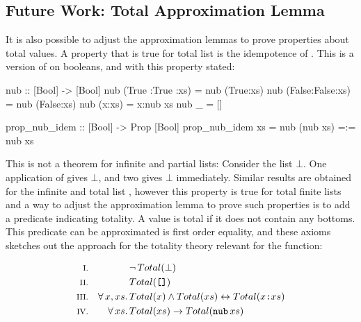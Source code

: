 
\subsection{Future Work: Total Approximation Lemma}
\label{sec:totalapprox}

It is also possible to adjust the approximation lemmas to prove
properties about total values. A property that is true for total list
is the idempotence of . This is a version of  on
booleans, and with this property stated:

\begin{code}
nub :: [Bool] -> [Bool]
nub (True :True :xs) = nub (True:xs)
nub (False:False:xs) = nub (False:xs)
nub (x:xs)           = x:nub xs
nub _                = []

prop_nub_idem :: [Bool] -> Prop [Bool]
prop_nub_idem xs = nub (nub xs) =:= nub xs
\end{code}

\noindent
This is not a theorem for infinite and partial lists: Consider the
list $\bot$. One application of  gives
$\bot$, and two gives $\bot$ immediately. Similar results
are obtained for the infinite and total list , however
this property is true for total finite lists and a way to adjust the
approximation lemma to prove such properties is to add a predicate
indicating totality. A value is total if it does not contain any
bottoms. This predicate can be approximated is first order equality,
and these axioms sketches out the approach for the totality theory
relevant for the  function:

\begin{align*}
\rom{1} &&             & \neg \, Total(\bot) \\
\rom{2} &&             & Total(\hs{[]}) \\
\rom{3} && \faa{x}{xs} & Total(x) \wedge Total(xs) \leftrightarrow Total(x\hs{:}xs) \\
\rom{4} && \fa{xs}     & Total(xs) \rightarrow Total(\hs{nub} \, xs) \\
\end{align*}

